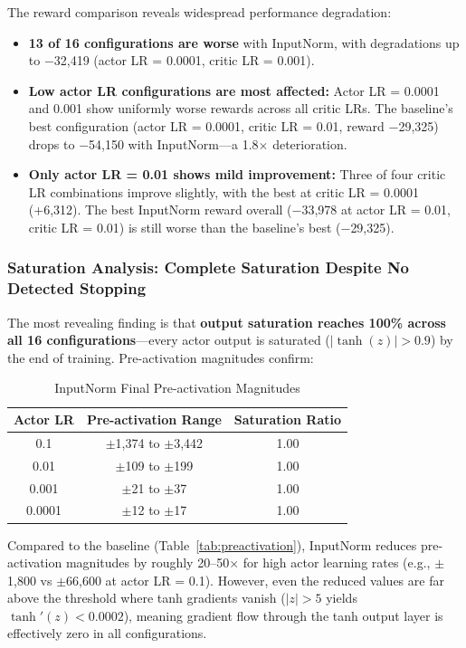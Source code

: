 The reward comparison reveals widespread performance degradation:
\begin{itemize}
    \item \textbf{13 of 16 configurations are worse} with InputNorm, with degradations up to $-$32,419 (actor LR = 0.0001, critic LR = 0.001).

    \item \textbf{Low actor LR configurations are most affected:} Actor LR = 0.0001 and 0.001 show uniformly worse rewards across all critic LRs. The baseline's best configuration (actor LR = 0.0001, critic LR = 0.01, reward $-$29,325) drops to $-$54,150 with InputNorm---a 1.8$\times$ deterioration.

    \item \textbf{Only actor LR = 0.01 shows mild improvement:} Three of four critic LR combinations improve slightly, with the best at critic LR = 0.0001 (+6,312). The best InputNorm reward overall ($-$33,978 at actor LR = 0.01, critic LR = 0.01) is still worse than the baseline's best ($-$29,325).
\end{itemize}

\subsubsection{Saturation Analysis: Complete Saturation Despite No Detected Stopping}

The most revealing finding is that \textbf{output saturation reaches 100\% across all 16 configurations}---every actor output is saturated ($|\tanh(z)| > 0.9$) by the end of training. Pre-activation magnitudes confirm:

\begin{table}[htbp]
\caption{InputNorm Final Pre-activation Magnitudes}
\label{tab:inputnorm_preact}
\centering
\small
\begin{tabular}{ccc}
\toprule
\textbf{Actor LR} & \textbf{Pre-activation Range} & \textbf{Saturation Ratio} \\
\midrule
0.1 & $\pm$1,374 to $\pm$3,442 & 1.00 \\
0.01 & $\pm$109 to $\pm$199 & 1.00 \\
0.001 & $\pm$21 to $\pm$37 & 1.00 \\
0.0001 & $\pm$12 to $\pm$17 & 1.00 \\
\bottomrule
\end{tabular}
\end{table}

Compared to the baseline (Table~\ref{tab:preactivation}), InputNorm reduces pre-activation magnitudes by roughly 20--50$\times$ for high actor learning rates (e.g., $\pm$1,800 vs $\pm$66,600 at actor LR = 0.1). However, even the reduced values are far above the threshold where tanh gradients vanish ($|z| > 5$ yields $\tanh'(z) < 0.0002$), meaning gradient flow through the tanh output layer is effectively zero in all configurations.

